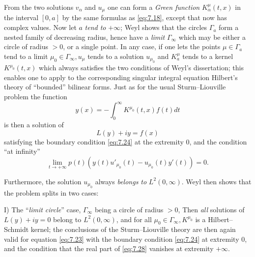 \documentclass[12pt,a4paper,leqno,twoside]{extbook}
\begin{document}
From the two solutions \(v_\alpha\) and \(u_\mu\) one can form a \emph{Green function} \(K^\mu_\alpha(t,x)\) in the interval \([0,a]\) by the same formulas as \eqref{eq:7.18}, except that now has complex values. Now let \(a\) \emph{tend to} \(+\infty\); Weyl shows that the circles \(\Gamma_a\) form a nested family of decreasing radius, hence have a \emph{limit} \(\Gamma_\infty\) which may be either a circle of radius \(>0\), or a single point. In any case, if one lets the points \(\mu \in \Gamma_a\) tend to a limit \(\mu_0 \in \Gamma_\infty, u_\mu\) tends to a solution \(u_{\mu_0}\) and \(K^\mu_a\) tends to a kernel \(K^{\mu_0}(t,x)\) which always satisfies the two conditions of Weyl's dissertation; this enables one to apply to the corresponding singular integral equation Hilbert's theory of ``bounded'' bilinear forms. Just as for the usual Sturm--Liouville problem the function
\begin{equation}
    \label{eq:7.26}
    y(x) = -\int_0^\infty K^{\mu_0}(t,x)f(t)dt
\end{equation}
is then a solution of
\begin{equation}
    \label{eq:7.27}
    L(y) + iy = f(x)
\end{equation}
satisfying the boundary condition \eqref{eq:7.24} at the extremity 0, and the condition ``at infinity''
\begin{equation}
    \label{eq:7.28}
    \lim_{t \to +\infty} p(t)\left( y(t)u'_{\mu_0}(t) - u_{\mu_0}(t)y'(t) \right) = 0.
\end{equation}

Furthermore, the solution \(u_{\mu_0}\) always \emph{belongs to} \(L^2(0,\infty)\). Weyl then shows that the problem splits in two cases:

I) The ``\emph{limit circle}'' case, \(\Gamma_\infty\) being a circle of radius \(>0\), Then \emph{all} solutions of \(L(y) + iy = 0\) belong to \(L^2(0,\infty)\), and for all \(\mu_0 \in \Gamma_\infty, K^{\mu_0}\) is a Hilbert--Schmidt kernel; the conclusions of the Sturm--Liouville theory are then again valid for equation \eqref{eq:7.23} with the boundary condition \eqref{eq:7.24} at extremity 0, and the condition that the real part of \eqref{eq:7.28} vanishes at extremity \(+\infty\).
\end{document}
